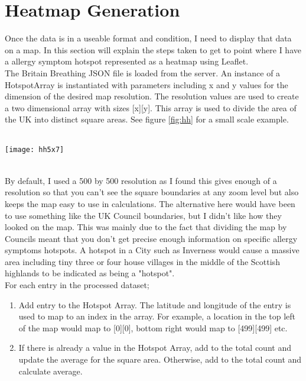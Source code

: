 \section{Heatmap Generation}

Once the data is in a useable format and condition, I need to display that data on a map. In this section will explain the steps taken to get to point where I have a allergy symptom hotspot represented as a heatmap using Leaflet.\\

The Britain Breathing JSON file is loaded from the server. An instance of a HotspotArray is instantiated with parameters including x and y values for the dimension of the desired map resolution. The resolution values are used to create a two dimensional array with sizes [x][y]. This array is used to divide the area of the UK into distinct square areas. See figure \ref{fig:hh} for a small scale example.

\begin{SCfigure}
\label{fig:hh}
\caption{Figure \ref{fig:hh} : A [5][7] resolution example}\\
\centering
\texttt{[image: hh5x7]}
\centering
\end{SCfigure}\\

By default, I used a 500 by 500 resolution as I found this gives enough of a resolution so that you can't see the square boundaries at any zoom level but also keeps the map easy to use in calculations. The alternative here would have been to use something like the UK Council boundaries, but I didn't like how they looked on the map. This was mainly due to the fact that dividing the map by Councils meant that you don't get precise enough information on specific allergy symptoms hotspots. A hotspot in a City such as Inverness would cause a massive area including tiny three or four house villages in the middle of the Scottish highlands to be indicated as being a "hotspot".\\

For each entry in the processed dataset;

\begin{enumerate}
    \item Add entry to the Hotspot Array. The latitude and longitude of the entry is used to map to an index in the array. For example, a location in the top left of the map would map to [0][0], bottom right would map to [499][499] etc. 
    \item If there is already a value in the Hotspot Array, add to the total count and update the average for the square area. Otherwise, add to the total count and calculate average.
\end{enumerate}

